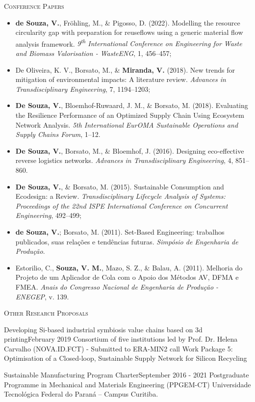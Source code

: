 \textsc{Conference Papers}

    \begin{itemize}
        \item \textbf{de Souza, V.}, Fröhling, M., \& Pigosso, D. (2022). Modelling the resource circularity gap with preparation for reuseflows using a generic material flow analysis framework. \textit{9\textsuperscript{th} International Conference on Engineering for Waste and Biomass Valorisation - WasteENG}, 1, 456–457;
        \item De Oliveira, K. V., Borsato, M., \& \textbf{Miranda, V.} (2018). New trends for mitigation of environmental impacts: A literature review. \textit{Advances in Transdisciplinary Engineering}, 7, 1194–1203;
        \item \textbf{De Souza, V.}, Bloemhof-Ruwaard, J. M., \& Borsato, M. (2018). Evaluating the Resilience Performance of an Optimized Supply Chain Using Ecosystem Network Analysis. \textit{5th International EurOMA Sustainable Operations and Supply Chains Forum}, 1–12.
        \item \textbf{De Souza, V.}, Borsato, M., \& Bloemhof, J. (2016). Designing eco-effective reverse logistics networks. \textit{Advances in Transdisciplinary Engineering}, 4, 851–860.
        \item \textbf{De Souza, V.}, \& Borsato, M. (2015). Sustainable Consumption and Ecodesign: a Review. \textit{Transdisciplinary Lifecycle Analysis of Systems: Proceedings of the 22nd ISPE International Conference on Concurrent Engineering}, 492–499;
        \item \textbf{de Souza, V.}; Borsato, M. (2011). Set-Based Engineering: trabalhos publicados, suas relações e tendências futuras. \textit{Simpósio de Engenharia de Produção}.
        \item Estorilio, C., \textbf{Souza, V. M.}, Mazo, S. Z., \& Balau, A. (2011). Melhoria do Projeto de um Aplicador de Cola com o Apoio dos Métodos AV, DFMA e FMEA. \textit{Anais do Congresso Nacional de Engenharia de Produção - ENEGEP}, v. 139. 
    \end{itemize}

\textsc{Other Research Proposals}

\begin{projects}
    \project
	    {Developing Si-based industrial symbiosis value chains based on 3d printing}{February 2019}
	    {Consortium of five institutions led by Prof. Dr. Helena Carvalho (NOVA.ID.FCT) - Submitted to ERA-MIN2 call}
	    {Work Package 5: Optimisation of a Closed-loop, Sustainable Supply Network for Silicon Recycling}
\end{projects}    
\vspace{-30pt} 
\begin{projects}
    \project
	    {Sustainable Manufacturing Program Charter}{September 2016 - 2021}
	    {Postgraduate Programme in Mechanical and Materials Engineering (PPGEM-CT)}
	    {Universidade Tecnológica Federal do Paraná – Campus Curitiba.}
\end{projects}    
\vspace{-25pt}    

